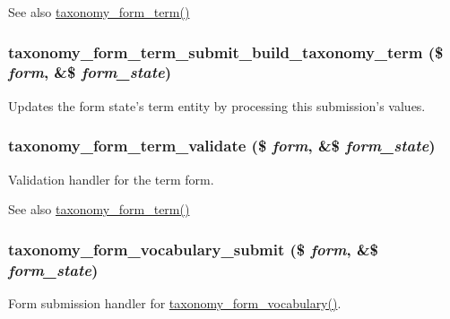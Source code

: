 \begin{DoxySeeAlso}{See also}
\hyperlink{group__forms_gadd038edd60ebd00177106bb97841803c}{taxonomy\_\-form\_\-term()} 
\end{DoxySeeAlso}
\hypertarget{taxonomy_8admin_8inc_a8bc6a33a0efac58f69913a7a5301e7ee}{
\subsubsection[{taxonomy\_\-form\_\-term\_\-submit\_\-build\_\-taxonomy\_\-term}]{\setlength{\rightskip}{0pt plus 5cm}taxonomy\_\-form\_\-term\_\-submit\_\-build\_\-taxonomy\_\-term (\$ {\em form}, \/  \&\$ {\em form\_\-state})}}
\label{taxonomy_8admin_8inc_a8bc6a33a0efac58f69913a7a5301e7ee}
Updates the form state's term entity by processing this submission's values. \hypertarget{taxonomy_8admin_8inc_ab8a69acec84eb6217604c066b33deab1}{
\subsubsection[{taxonomy\_\-form\_\-term\_\-validate}]{\setlength{\rightskip}{0pt plus 5cm}taxonomy\_\-form\_\-term\_\-validate (\$ {\em form}, \/  \&\$ {\em form\_\-state})}}
\label{taxonomy_8admin_8inc_ab8a69acec84eb6217604c066b33deab1}
Validation handler for the term form.

\begin{DoxySeeAlso}{See also}
\hyperlink{group__forms_gadd038edd60ebd00177106bb97841803c}{taxonomy\_\-form\_\-term()} 
\end{DoxySeeAlso}
\hypertarget{taxonomy_8admin_8inc_a5fe8d2d826372a29a068cd2c39e38636}{
\subsubsection[{taxonomy\_\-form\_\-vocabulary\_\-submit}]{\setlength{\rightskip}{0pt plus 5cm}taxonomy\_\-form\_\-vocabulary\_\-submit (\$ {\em form}, \/  \&\$ {\em form\_\-state})}}
\label{taxonomy_8admin_8inc_a5fe8d2d826372a29a068cd2c39e38636}
Form submission handler for \hyperlink{group__forms_gafb93f170208a8c9c125b31ac91e1f966}{taxonomy\_\-form\_\-vocabulary()}.

